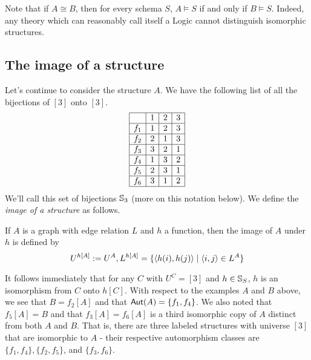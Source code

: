 Note that if $A\cong B$, then for every schema $S$, $A\models S$ if and only if $B\models S$. Indeed, any theory which can reasonably call itself a Logic cannot distinguish isomorphic structures. 

\subsection*{The image of a structure}
Let's continue to consider the structure $A$. We have the following list of all the bijections of $[3]$ onto $[3]$.
\[
\begin{array}{|c|c|c|c|}
\hline
 &1&2&3\\
\hline
f_1&1&2&3\\
\hline
f_2&2&1&3\\
\hline
f_3&3&2&1\\
\hline
f_4&1&3&2\\
\hline
f_5&2&3&1\\
\hline
f_6&3&1&2\\
\hline

\end{array}
\]
We'll call this set of bijections $\mbox{$\mathbb{S}_{3}$}$ (more on this notation below). We define the \emph{image of a structure} as follows.

\begin{definition}
If $A$ is a graph with edge relation $L$ and $h$ a function, then the image of $A$ under $h$ is defined by
\[
    U^{h[A]} := U^A, L^{h[A]}=\{\mbox{$\langle h(i),h(j) \rangle$}\mid\mbox{$\langle i,j \rangle$}\in L^A\}
\]
\end{definition}

It follows immediately that for any $C$ with $U^C = [3]$ and $h \in \mbox{$\mathbb{S}_{S}$}$, $h$ is an isomorphism from $C$ onto $h[C]$. 
With respect to the examples $A$ and $B$ above, we see that $B=f_2[A]$ and that $\mbox{$\mathsf{Aut}(A)$}=\{f_1,f_4\}$. We also noted that $f_5[A]=B$ and that $f_3[A]=f_6[A]$ is a third isomorphic copy of $A$ distinct from both $A$ and $B$. That is, there are three labeled structures with universe $[3]$ that are isomorphic to $A$ - their respective automorphism classes are $\{f_1, f_4\}, \{f_2, f_5\}$, and $\{f_3, f_6\}$. 

